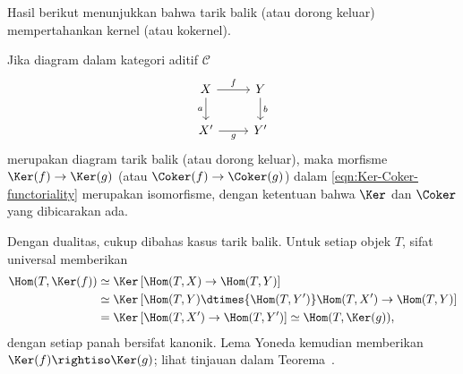 Hasil berikut menunjukkan bahwa tarik balik (atau dorong keluar)
mempertahankan kernel (atau kokernel).

\begin{proposisi}\label{prop:pull-back-ker}
	Jika diagram dalam kategori aditif $\mathcal{C}$
	\[\begin{tikzcd}
		X \arrow[r, "f"] \arrow[d, "a"'] & Y \arrow[d, "b"] \\
		X' \arrow[r, "g"'] & Y'
	\end{tikzcd}\]
	merupakan diagram tarik balik (atau dorong keluar), maka morfisme
	$\Ker(f) \to \Ker(g)$ (atau $\Coker(f) \to \Coker(g)$) dalam
	\eqref{eqn:Ker-Coker-functoriality} merupakan isomorfisme, dengan ketentuan
	bahwa $\Ker$ dan $\Coker$ yang dibicarakan ada.
\end{proposisi}

\begin{bukti}
	Dengan dualitas, cukup dibahas kasus tarik balik. Untuk setiap objek $T$,
	sifat universal memberikan
	\begin{align*}
		\Hom(T, \Ker(f)) & \simeq \Ker\left[ \Hom(T, X) \to \Hom(T, Y) \right] \\
		& \simeq \Ker\left[ \Hom(T, Y) \dtimes{\Hom(T, Y')} \Hom(T, X') \to \Hom(T, Y) \right] \\
		& = \Ker\left[ \Hom(T, X') \to \Hom(T, Y') \right] \simeq \Hom(T, \Ker(g)),
	\end{align*}
	dengan setiap panah bersifat kanonik. Lema Yoneda kemudian memberikan
	$\Ker(f) \rightiso \Ker(g)$; lihat tinjauan dalam
	Teorema~.
\end{bukti}

